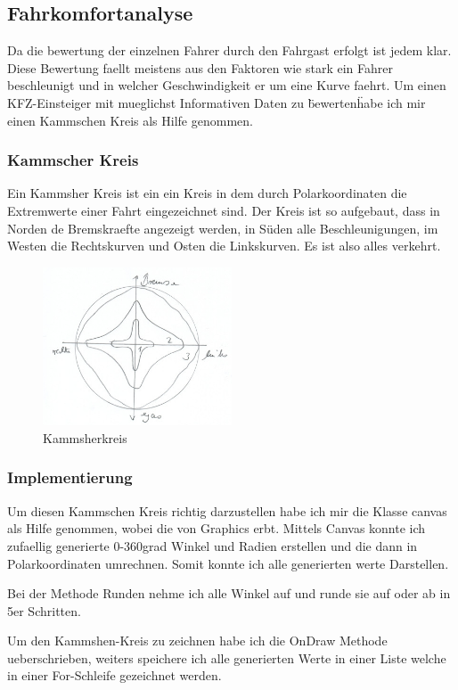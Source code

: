 \subsection{Fahrkomfortanalyse}


Da die bewertung der einzelnen Fahrer durch den Fahrgast erfolgt ist jedem klar.
Diese Bewertung faellt meistens aus den Faktoren wie stark ein Fahrer beschleunigt und in welcher Geschwindigkeit er um eine Kurve faehrt.
Um einen KFZ-Einsteiger mit mueglichst Informativen Daten zu \"bewerten\" habe ich mir einen Kammschen Kreis als Hilfe genommen.

\subsubsection{Kammscher Kreis }
Ein Kammsher Kreis ist ein ein Kreis in dem durch Polarkoordinaten die Extremwerte einer Fahrt eingezeichnet sind.
Der Kreis ist so aufgebaut, dass in Norden de Bremskraefte angezeigt werden, in Süden alle Beschleunigungen, im Westen die Rechtskurven und Osten die Linkskurven.
Es ist also alles verkehrt.
\begin{figure}[!htb]\centering
	\includegraphics[width=0.5\textwidth]{images/kammsherkreis}
	\caption{Kammsherkreis \cite{FAIF.CH3-fahrkomfortanalyse.KammscherKreis}}\label{Fig:Kammsher-Kreis}
\end{figure}

\subsubsection{Implementierung}
Um diesen Kammschen Kreis richtig darzustellen habe ich mir die Klasse canvas als Hilfe genommen, wobei die von Graphics erbt.
Mittels Canvas konnte ich zufaellig generierte 0-360grad Winkel und Radien erstellen und die dann in Polarkoordinaten umrechnen.
Somit konnte ich alle generierten werte Darstellen. 



Bei der Methode Runden nehme ich alle Winkel auf und runde sie auf oder ab in 5er Schritten.
\newline 



Um den Kammshen-Kreis zu zeichnen habe ich die OnDraw Methode ueberschrieben, weiters speichere ich alle generierten Werte in einer Liste welche in einer For-Schleife gezeichnet werden.
\clearpage %